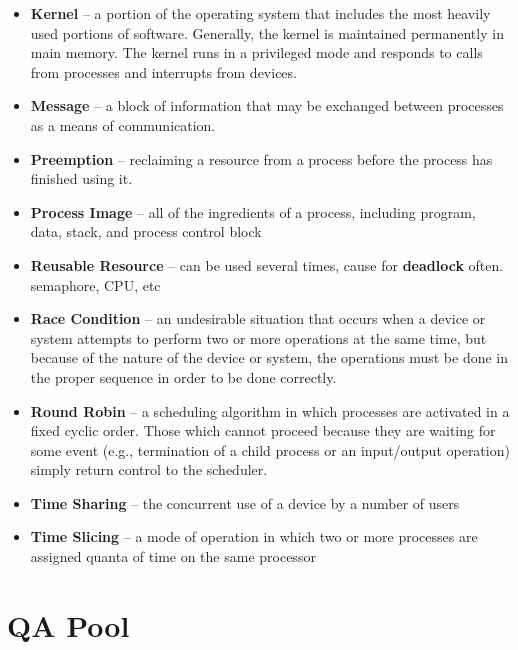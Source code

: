 \documentclass[fontsize=5pt]{scrartcl}
\begin{document}
\begin{multicols}{3}
\begin{itemize}
      \item \textbf{Kernel} – a portion of the operating system that includes the most heavily used portions of software.  Generally, the kernel is maintained permanently in main memory.  
              The kernel runs in a privileged mode and responds to calls from processes and interrupts from devices.
      \item \textbf{Message} – a block of information that may be exchanged between processes as a means of communication.
      \item \textbf{Preemption} – reclaiming a resource from a process before the process has finished using it.
      \item \textbf{Process Image} – all of the ingredients of a process, including program, data, stack, and process control block
      \item \textbf{Reusable Resource} – can be used several times, cause for \textbf{deadlock} often. semaphore, CPU, etc
      \item \textbf{Race Condition} – an undesirable situation that occurs when a device or system attempts to perform two or more operations at the same time, but because of the nature of the device or system, 
      the operations must be done in the proper sequence in order to be done correctly.
      \item \textbf{Round Robin} – a scheduling algorithm in which processes are activated in a fixed cyclic order.  Those which cannot proceed because they are waiting for some event 
                    (e.g., termination of a child process or an input/output operation) simply return control to the scheduler.
      \item \textbf{Time Sharing} – the concurrent use of a device by a number of users
      \item \textbf{Time Slicing} – a mode of operation in which two or more processes are assigned quanta of time on the same processor
    \end{itemize}
  \section{QA Pool}

\end{multicols}
\end{document}
